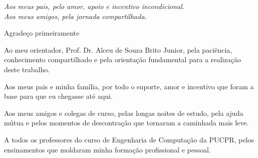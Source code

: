 \documentclass[
	a4paper,      %
	12pt,         %
	english,      %
	oneside,      %
	openany       %
]{abntex2}
\begin{document}


\imprimircapa

\imprimirfolhaderosto

\begin{dedicatoria}
	\vspace*{\fill} %
	\begin{flushright} %
		\textit{Aos meus pais, pelo amor, apoio e incentivo incondicional.\\
		Aos meus amigos, pela jornada compartilhada.}
	\end{flushright}
\end{dedicatoria}

\begin{agradecimentos}
	Agradeço primeiramente 

	Ao meu orientador, Prof. Dr. Alceu de Souza Brito Junior, pela paciência, conhecimento compartilhado e pela orientação fundamental para a realização deste trabalho.
	
	Aos meus pais e minha família, por todo o suporte, amor e incentivo que foram a base para que eu chegasse até aqui.
	
	Aos meus amigos e colegas de curso, pelas longas noites de estudo, pela ajuda mútua e pelos momentos de descontração que tornaram a caminhada mais leve.
	
	A todos os professores do curso de Engenharia de Computação da PUCPR, pelos ensinamentos que moldaram minha formação profissional e pessoal.

\end{agradecimentos}

\end{document}
